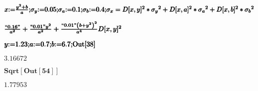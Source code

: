 \documentclass{article}
\begin{document}
\begin{doublespace}
\noindent\(\pmb{x\text{:=}\frac{y^2+b}{a};}\\
\pmb{\sigma _y\text{:=}0.05;}\\
\pmb{\sigma _a\text{:=}0.1;}\\
\pmb{\sigma _b\text{:=}0.4;}\\
\pmb{\sigma _x=D[x,y]^2*\sigma _y{}^2+D[x,a]^2*\sigma _a{}^2+D[x,b]^2*\sigma _b{}^2}\)
\end{doublespace}

\begin{doublespace}
\noindent\(\pmb{\frac{\text{{``}0.16{''}}}{a^2}+\frac{\text{{``}0.01{''}} y^2}{a^2}+\frac{\text{{``}0.01{''}} \left(b+y^2\right)^2}{a^4}}\\
\pmb{D[x,y]^2}\)
\end{doublespace}

\begin{doublespace}
\noindent\(\pmb{y\text{:=}1.23;}\\
\pmb{a\text{:=}0.7;}\\
\pmb{b\text{:=}6.7;}\\
\pmb{\text{Out}[38]}\)
\end{doublespace}

\begin{doublespace}
\noindent\(3.16672\)
\end{doublespace}

\begin{doublespace}
\noindent\(\pmb{\text{Sqrt}[\text{Out}[54]]}\)
\end{doublespace}

\begin{doublespace}
\noindent\(1.77953\)
\end{doublespace}
\end{document}
